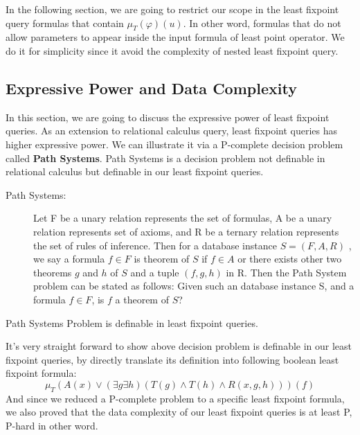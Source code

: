 In the following section, we are going to restrict our scope in the least fixpoint query formulas that contain $\mu_T(\varphi)(u)$. In other word, formulas that do not allow parameters to appear inside the input formula of least point operator. We do it for simplicity since it avoid the complexity of nested least fixpoint query.\\ 

\subsection{Expressive Power and Data Complexity}

In this section, we are going to discuss the expressive power of least fixpoint queries. As an extension to relational calculus query, least fixpoint queries has higher expressive power. We can illustrate it via a P-complete decision problem called \textbf{Path Systems}\cite{Cook}. Path Systems is a decision problem not definable in relational calculus but definable in our least fixpoint queries. \\

\begin{description}
\item[Path Systems:]
Let F be a unary relation represents the set of formulas, A be a unary relation represents set of axioms, and R be a ternary relation represents the set of rules of inference. Then for a database instance $S = (F, A, R) $ , we say a formula $f\in F$ is theorem of $S$ if $f\in A$ or there exists other two theorems $g$ and $h $ of $S$ and a tuple $(f, g, h)$ in R. Then the Path System problem can be stated as follows: Given such an database instance S, and a formula $f\in F$, is $f$ a theorem of $S$?\\
\end{description}

\begin{claim}
Path Systems Problem is definable in least fixpoint queries.
\end{claim}

It's very straight forward to show above decision problem is definable in our least fixpoint queries, by directly translate its definition into following boolean least fixpoint formula:
$$ \mu_T(A(x)\lor (\exists g \exists h)(T(g)\land T(h) \land R(x, g, h)))(f) $$
And since we reduced a P-complete problem to a specific least fixpoint formula, we also proved that the data complexity of our least fixpoint queries is at least P, P-hard in other word.\\

